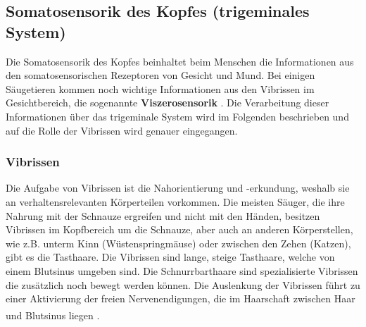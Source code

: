 \documentclass[12pt,a4paper,pdftex]{article}
\begin{document}
\newpage
\subsection{Somatosensorik des Kopfes (trigeminales System) }
\label{sec:somatokopf}
Die Somatosensorik des Kopfes beinhaltet beim Menschen die Informationen aus den somatosensorischen Rezeptoren von Gesicht und Mund. Bei einigen Säugetieren kommen noch wichtige Informationen aus den Vibrissen im Gesichtbereich, die sogenannte \textbf{Viszerosensorik} . Die Verarbeitung dieser Informationen über das trigeminale System wird im Folgenden beschrieben und auf die Rolle der Vibrissen wird genauer eingegangen.

\subsubsection*{Vibrissen}
Die Aufgabe von Vibrissen ist die Nahorientierung und -erkundung, weshalb sie an verhaltensrelevanten Körperteilen vorkommen. Die meisten Säuger, die ihre Nahrung mit der Schnauze ergreifen und nicht mit den Händen, besitzen Vibrissen im Kopfbereich um die Schnauze, aber auch an anderen Körperstellen, wie z.B. unterm Kinn (Wüstenspringmäuse) oder zwischen den Zehen (Katzen), gibt es die Tasthaare. Die Vibrissen sind lange, steige Tasthaare, welche von einem Blutsinus umgeben sind. Die Schnurrbarthaare  sind spezialisierte Vibrissen die zusätzlich noch bewegt werden können. 
Die Auslenkung der Vibrissen führt zu einer Aktivierung der freien Nervenendigungen, die im Haarschaft zwischen Haar und Blutsinus liegen \textsuperscript{\cite[5]{heldmaier2003tierphysiologie}}.
\end{document}
